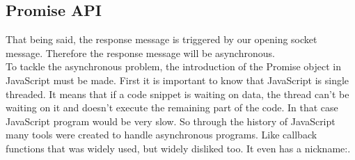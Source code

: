 \documentclass[11pt, a4paper, twoside, openright]{book} %
\begin{document}
\subsection{Promise API}
That being said, the response message is triggered by our opening socket message. Therefore the
response message will be asynchronous.\\
To tackle the asynchronous problem, the introduction of the Promise object in JavaScript must be
made. First it is important to know that JavaScript is single threaded. It means
that if a code snippet is waiting on data, the thread can't be waiting on it and doesn't execute
the remaining part of the code. In that case JavaScript program would be very slow.
So through the history of JavaScript many tools were created to handle asynchronous programs.
Like callback functions that was widely used, but widely disliked too. It even has a nickname:.\\
\end{document}
